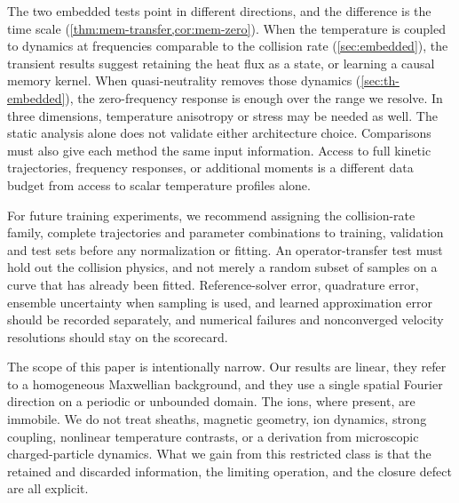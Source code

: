 \documentclass[11pt]{article}
\theoremstyle{definition}
\theoremstyle{remark}
\numberwithin{equation}{section}
\begin{document}
The two embedded tests point in different directions, and the difference
is the time scale (\cref{thm:mem-transfer,cor:mem-zero}). When the temperature is coupled to dynamics at
frequencies comparable to the collision rate (\cref{sec:embedded}), the
transient results suggest retaining the heat flux as a state, or
learning a causal memory kernel. When quasi-neutrality removes those
dynamics (\cref{sec:th-embedded}), the zero-frequency response is
enough over the range we resolve. In three dimensions, temperature anisotropy
or stress may be needed as well. The static analysis alone does not
validate either architecture choice. Comparisons must also give each
method the same input information. Access to full kinetic trajectories,
frequency responses, or additional moments is a different data budget
from access to scalar temperature profiles alone.

For future training experiments, we recommend assigning the
collision-rate family, complete trajectories and parameter combinations
to training, validation and test sets before any normalization or
fitting. An operator-transfer test must hold out the collision physics,
and not merely a random subset of samples on a curve that has already
been fitted. Reference-solver error, quadrature error, ensemble
uncertainty when sampling is used, and learned approximation error
should be recorded separately, and numerical failures and nonconverged
velocity resolutions should stay on the scorecard.

The scope of this paper is intentionally narrow. Our results are linear,
they refer to a homogeneous Maxwellian background, and they use a single
spatial Fourier direction on a periodic or unbounded domain. The ions,
where present, are immobile. We do not
treat sheaths, magnetic geometry, ion dynamics, strong
coupling, nonlinear temperature contrasts, or a derivation from
microscopic charged-particle dynamics.
What we gain from this restricted class is that the retained and
discarded information, the limiting operation, and the closure defect
are all explicit.
\end{document}

